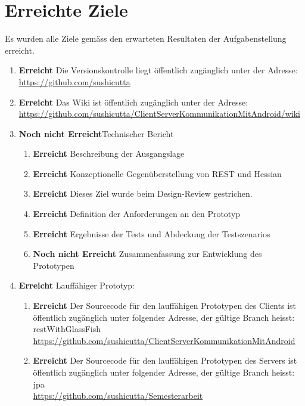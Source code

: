 \documentclass[abstracton, listof=totocnumbered,
bibliography=totocnumbered]{scrreprt}
\begin{document}
  \newpage  
  
  \chapter{Erreichte Ziele}
  
  Es wurden alle Ziele gemäss den erwarteten Resultaten der Aufgabenstellung
  erreicht.
  
  \begin{enumerate}
    \item \textbf{Erreicht} Die Versionskontrolle liegt öffentlich zugänglich unter der
          Adresse:\\
          \url{https://github.com/sushicutta}
    \item \textbf{Erreicht} Das Wiki ist öffentlich zugänglich unter der
          Adresse:\\
          \url{https://github.com/sushicutta/ClientServerKommunikationMitAndroid/wiki}
    \item \textbf{Noch nicht Erreicht}Technischer Bericht
    \begin{enumerate}
      \item \textbf{Erreicht} Beschreibung der Ausgangslage
      \item \textbf{Erreicht} Konzeptionelle Gegenüberstellung von \ac{REST} und
            Hessian
      \item \textbf{Erreicht} Dieses Ziel wurde beim Design-Review gestrichen. 
      \item \textbf{Erreicht} Definition der Anforderungen an den Prototyp
      \item \textbf{Erreicht} Ergebnisse der Tests und Abdeckung der Testszenarios
      \item \textbf{Noch nicht Erreicht} Zusammenfassung zur Entwicklung des
            Prototypen
    \end{enumerate}
    \item \textbf{Erreicht} Lauffähiger Prototyp:
    \begin{enumerate}
      \item \textbf{Erreicht} Der Sourcecode für den lauffähigen Prototypen des
      Clients ist öffentlich zugänglich unter folgender Adresse, der gültige Branch
      heisst: restWithGlassFish\\
      \url{https://github.com/sushicutta/ClientServerKommunikationMitAndroid}
      \item \textbf{Erreicht} Der Sourcecode für den lauffähigen Prototypen des
      Servers ist öffentlich zugänglich unter folgender Adresse, der gültige Branch
      heisst: jpa\\
      \url{https://github.com/sushicutta/Semesterarbeit}
    \end{enumerate}
  \end{enumerate}
  
\end{document}
